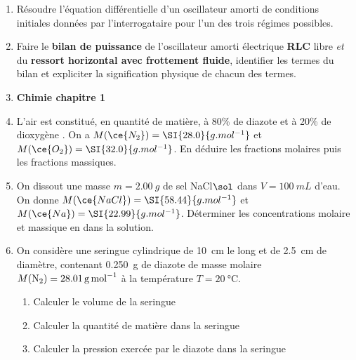 \documentclass[a4paper, 12pt, final, garamond]{book}
\begin{document}
\begin{enumerate}
  \item Résoudre l'équation différentielle d'un oscillateur amorti de conditions
        initiales données par l'interrogataire pour l'un des trois régimes
        possibles.

  \item Faire le \textbf{bilan de puissance} de l'oscillateur amorti électrique
        \textbf{RLC} libre \textit{et} du \textbf{ressort horizontal avec
        frottement fluide}, identifier les termes du bilan et expliciter la
        signification physique de chacun des termes.
  \item[] \textbf{Chimie chapitre 1}
  \item L'air est constitué, en quantité de matière, à 80\% de diazote  et
	à 20\% de dioxygène .
	\smallbreak
	On a
	$M(\ce{N_2}) = \SI{28.0}{g.mol^{-1}}$ et
	$M(\ce{O_2}) = \SI{32.0}{g.mol^{-1}}$.
	\smallbreak
	En déduire les fractions molaires puis les fractions massiques.
	\item On dissout une masse $m = \SI{2.00}{g}$ de sel NaCl$\sol$ dans $V =
		\SI{100}{mL}$ d'eau.
	\smallbreak
	On donne
  $M(\ce{NaCl}) = \SI{58.44}{g.mol^{-1}}$ et
	$M(\ce{Na}) = \SI{22.99}{g.mol^{-1}}$.
	\smallbreak
  Déterminer les concentrations molaire et massique en  dans la
  solution.
  \item On considère une seringue cylindrique de \SI{10}{cm} le long et de
	\SI{2.5}{cm} de diamètre, contenant \SI{0.250}{g} de diazote de masse
	molaire $M({\rm N}_2) = \SI{28.01}{g.mol^{-1}}$ à la
	température $T = \SI{20}{\degreeCelsius}$.
	\begin{enumerate}
		\item Calculer le volume de la seringue
		\item Calculer la quantité de matière dans la seringue
		\item Calculer la pression exercée par le diazote dans la seringue
	\end{enumerate}
\end{enumerate}
\end{document}
